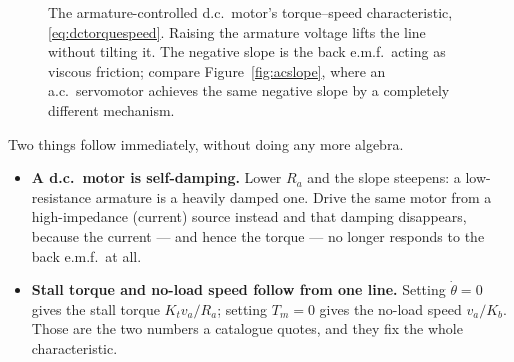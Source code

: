 \documentclass[11pt,a4paper]{article}
\begin{document}
\begin{figure}[H]
\centering
{}
\caption{The armature-controlled d.c.\ motor's torque--speed characteristic,
\eqref{eq:dctorquespeed}. Raising the armature voltage lifts the line without
tilting it. The negative slope is the back e.m.f.\ acting as viscous friction;
compare Figure~\ref{fig:acslope}, where an a.c.\ servomotor achieves the same
negative slope by a completely different mechanism.}
\label{fig:dcslope}
\end{figure}

Two things follow immediately, without doing any more algebra.

\begin{itemize}[leftmargin=1.5em,itemsep=2pt]
\item \textbf{A d.c.\ motor is self-damping.} Lower $R_{a}$ and the slope
      steepens: a low-resistance armature is a heavily damped one. Drive the
      same motor from a high-impedance (current) source instead and that
      damping disappears, because the current --- and hence the torque --- no
      longer responds to the back e.m.f.\ at all.
\item \textbf{Stall torque and no-load speed follow from one line.} Setting
      $\dot\theta=0$ gives the stall torque $K_{t}v_{a}/R_{a}$; setting
      $T_{m}=0$ gives the no-load speed $v_{a}/K_{b}$. Those are the two
      numbers a catalogue quotes, and they fix the whole characteristic.
\end{itemize}
\end{document}

